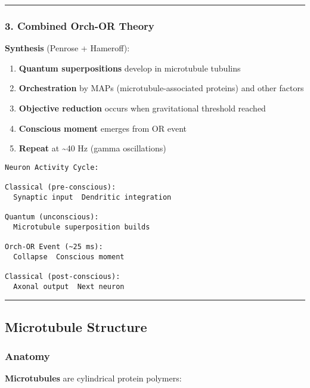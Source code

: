 \begin{center}\rule{0.5\linewidth}{0.5pt}\end{center}

\subsubsection{3. Combined Orch-OR
Theory}\label{combined-orch-or-theory}

\textbf{Synthesis} (Penrose + Hameroff):

\begin{enumerate}
\def\labelenumi{\arabic{enumi}.}
\tightlist
\item
  \textbf{Quantum superpositions} develop in microtubule tubulins
\item
  \textbf{Orchestration} by MAPs (microtubule-associated proteins) and
  other factors
\item
  \textbf{Objective reduction} occurs when gravitational threshold
  reached
\item
  \textbf{Conscious moment} emerges from OR event
\item
  \textbf{Repeat} at \textasciitilde40 Hz (gamma oscillations)
\end{enumerate}

\begin{verbatim}
Neuron Activity Cycle:

Classical (pre-conscious):
  Synaptic input  Dendritic integration
            
Quantum (unconscious):
  Microtubule superposition builds
            
Orch-OR Event (~25 ms):
  Collapse  Conscious moment
            
Classical (post-conscious):
  Axonal output  Next neuron
\end{verbatim}

\begin{center}\rule{0.5\linewidth}{0.5pt}\end{center}

\subsection{Microtubule Structure}\label{microtubule-structure}

\subsubsection{Anatomy}\label{anatomy}

\textbf{Microtubules} are cylindrical protein polymers:

